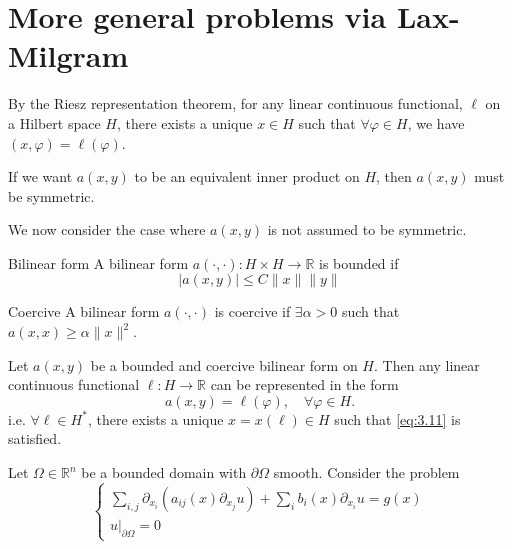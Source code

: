 \documentclass{report}
\begin{document}
\section{More general problems via Lax-Milgram}
By the Riesz representation theorem, for any linear continuous functional, \(\ell\) on a Hilbert space \(H\), there exists a unique \(x \in H\) such that \(\forall \varphi \in  H\), we have \((x, \varphi) = \ell(\varphi)\).

If we want \(a(x, y)\) to be an equivalent inner product on \(H\), then \(a(x, y)\) must be symmetric.

We now consider the case where \(a(x, y)\) is not assumed to be symmetric.

\begin{definition}{Bilinear form}{}
    A bilinear form \(a(\cdot, \cdot) \colon H \times H \rightarrow \mathbb{R}\) is bounded if 
    \[
        \vert a(x, y) \vert \leq C \|x\|\|y\|
    \]
\end{definition}

\begin{definition}{Coercive}{}
    A bilinear form \(a(\cdot, \cdot)\) is coercive if \(\exists \alpha > 0\) such that \(a(x, x) \geq \alpha\|x\|^{2}\). 
\end{definition}

\begin{theorem}{}{}
    Let \(a(x, y)\) be a bounded and coercive bilinear form on \(H\). Then any linear continuous functional \(\ell \colon H \to \mathbb{R}\) can be represented in the form
    \begin{equation}\label{eq:3.11}
        a(x, y) = \ell(\varphi), \quad \forall \varphi \in H.
    \end{equation}
    i.e. \(\forall \ell \in H^{*}\), there exists a unique \(x = x(\ell) \in H\) such that \ref{eq:3.11} is satisfied.
\end{theorem}

\begin{example}{}{}
    Let \(\Omega \in \mathbb{R}^{n}\) be a bounded domain with \(\partial \Omega\) smooth. Consider the problem
    \begin{equation}\label{eq:3.12}
        \begin{cases}
            \sum_{i, j} \partial_{x_{i}}(a_{ij}(x)\partial_{x_{j}}u) + \sum_{i}b_{i}(x) \partial_{x_{i}}u = g(x) \\
            \left. u \right|_{\partial \Omega} = 0
        \end{cases}
    \end{equation}
\end{example}
\end{document}
